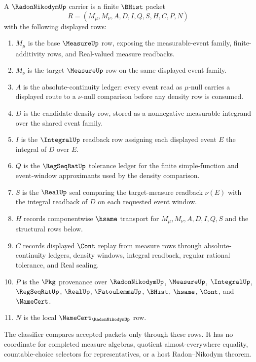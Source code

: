 \begin{definition}
\label{def:radon-nikodym-carrier}
A $\RadonNikodymUp$ carrier is a finite $\BHist$ packet
$$
R=(M_\mu,M_\nu,A,D,I,Q,S,H,C,P,N)
$$
with the following displayed rows:
\begin{enumerate}
\item $M_\mu$ is the base $\MeasureUp$ row, exposing the measurable-event family, finite-additivity rows, and Real-valued measure readbacks.
\item $M_\nu$ is the target $\MeasureUp$ row on the same displayed event family.
\item $A$ is the absolute-continuity ledger: every event read as $\mu$-null carries a displayed route to a $\nu$-null comparison before any density row is consumed.
\item $D$ is the candidate density row, stored as a nonnegative measurable integrand over the shared event family.
\item $I$ is the $\IntegralUp$ readback row assigning each displayed event $E$ the integral of $D$ over $E$.
\item $Q$ is the $\RegSeqRatUp$ tolerance ledger for the finite simple-function and event-window approximants used by the density comparison.
\item $S$ is the $\RealUp$ seal comparing the target-measure readback $\nu(E)$ with the integral readback of $D$ on each requested event window.
\item $H$ records componentwise $\hsame$ transport for $M_\mu,M_\nu,A,D,I,Q,S$ and the structural rows below.
\item $C$ records displayed $\Cont$ replay from measure rows through absolute-continuity ledgers, density windows, integral readback, regular rational tolerance, and Real sealing.
\item $P$ is the $\Pkg$ provenance over $\RadonNikodymUp$, $\MeasureUp$, $\IntegralUp$, $\RegSeqRatUp$, $\RealUp$, $\FatouLemmaUp$, $\BHist$, $\hsame$, $\Cont$, and $\NameCert$.
\item $N$ is the local $\NameCert_{\RadonNikodymUp}$ row.
\end{enumerate}
The classifier compares accepted packets only through these rows. It has no coordinate for completed measure algebras, quotient almost-everywhere equality, countable-choice selectors for representatives, or a host Radon--Nikodym theorem.
\end{definition}

